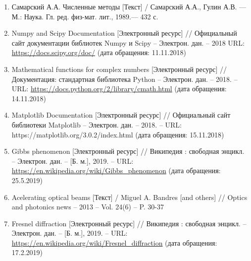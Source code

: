 \begin{enumerate}[label=\arabic*]
        \item
        Самарский А.А. Численные методы  [Текст] /
        Самарский А.А., Гулин А.В. — М.: Наука. Гл. ред. физ-мат. лит., 1989.— 432 с. \label{samarsky}

        \item
        Numpy and Scipy Documentation [Электронный ресурс] // Официальный
        сайт документации библиотек Numpy и Scipy – Электрон. дан. – 2018 URL:
        \url{https://docs.scipy.org/doc/} (дата обращения: 11.11.2018) \label{np}

        \item
        Mathematical functions for complex numbers [Электронный
        ресурс] // Документация: стандартная библиотека Python – Электрон. дан. – 2018. – URL: \url{https://docs.python.org/2/library/cmath.html} (дата обращения:
        14.11.2018) \label{cmath}

        \item
        Matplotlib Documentation [Электронный ресурс] // Официальный сайт
        библиотеки Matplotlib – Электрон. дан. – 2018. -- URL:
        https://matplotlib.org/3.0.2/index.html (дата обращения: 15.11.2018) \label{plt}

        \item
        Gibbs phenomenon [Электронный ресурс] // Википедия : свободная энцикл. –
        Электрон. дан. – [Б. м.], 2019. – URL: \url{https://en.wikipedia.org/wiki/Gibbs_phenomenon} (дата обращения: 25.5.2019) \label{gibbs}

        \item
        Acelerating optical beams [Текст] / Miguel A. Bandres [and others]  // Optics and photonics news – 2013 – Vol. 24(6) –
        P. 30-37 \label{airy_acc}

        \item
        Fresnel diffraction [Электронный ресурс] // Википедия : свободная энцикл. –
        Электрон. дан. – [Б. м.], 2019. – URL: \url{https://en.wikipedia.org/wiki/Fresnel_diffraction} (дата обращения:
        17.2.2019) \label{fres}

    \end{enumerate}
%
%
